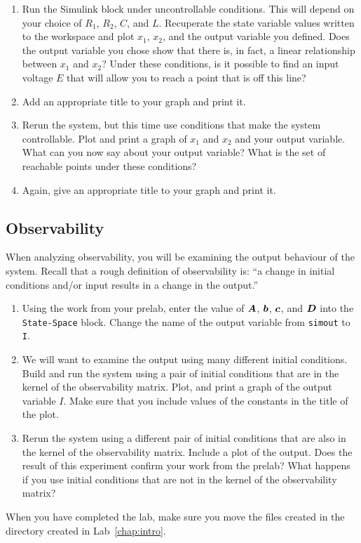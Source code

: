 \begin{enumerate}
\item Run the \textsf{Simulink} block under uncontrollable conditions. This
will depend on your choice of $R_{1}$\@, $R_{2}$\@, $C$\@, and $L$\@.
Recuperate the state variable values written to the workspace and plot
$x_{1}$\@, $x_{2}$\@, and the output variable you defined.  Does the output
variable you chose show that there is, in fact, a linear relationship between
$x_{1}$ and $x_{2}$? Under these conditions, is it possible to find an input
voltage $E$ that will allow you to reach a point that is off this line?

\item Add an appropriate title to your graph and print it.

\item Rerun the system, but this time use conditions that make the system
controllable.  Plot and print a graph of $x_{1}$ and $x_{2}$ and your output
variable.  What can you now say about your output variable?  What is the set
of reachable points under these conditions?

\item Again, give an appropriate title to your graph and print it.
\end{enumerate}

\subsection{Observability}

When analyzing observability, you will be examining the output behaviour of
the system.  Recall that a rough definition of observability is: ``a change
in initial conditions and/or input results in a change in the output.''
\begin{enumerate}
\item Using the work from your prelab, enter the value of $\boldsymbol{A}$\@,
$\boldsymbol{b}$\@, $\boldsymbol{c}$\@, and $\boldsymbol{D}$ into the \verb|State-Space| block.
Change the name of the output variable from \verb|simout| to \verb|I|.

\item We will want to examine the output using many different initial
conditions.  Build and run the system using a pair of initial conditions that
are in the kernel of the observability matrix.  Plot, and print a graph of
the output variable $I$.  Make sure that you include values of the constants
in the title of the plot.

\item Rerun the system using a different pair of initial conditions that are
also in the kernel of the observability matrix.  Include a plot of the
output.  Does the result of this experiment confirm your work from the
prelab? What happens if you use initial conditions that are not in the kernel
of the observability matrix?
\end{enumerate}

When you have completed the lab, make sure you move the files created in the
directory created in Lab~\ref{chap:intro}\@.

